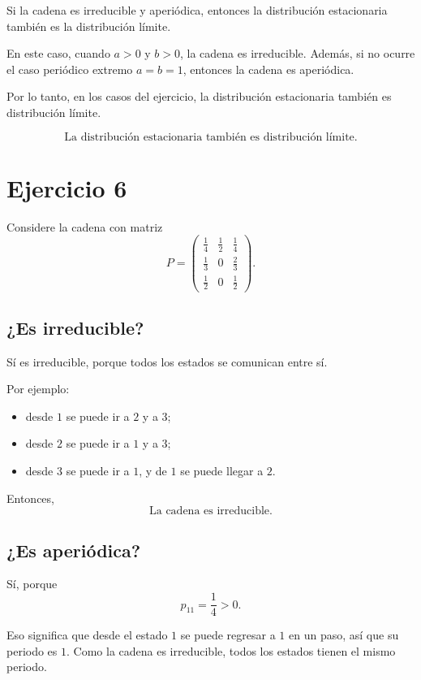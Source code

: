 \documentclass[12pt]{article}
\begin{document}
Si la cadena es irreducible y aperiódica, entonces la distribución estacionaria también es la distribución límite.

En este caso, cuando \(a>0\) y \(b>0\), la cadena es irreducible. Además, si no ocurre el caso periódico extremo \(a=b=1\), entonces la cadena es aperiódica.

Por lo tanto, en los casos del ejercicio, la distribución estacionaria también es distribución límite.

\[
\boxed{\text{La distribución estacionaria también es distribución límite.}}
\]

\newpage
\section*{Ejercicio 6}

Considere la cadena con matriz
\[
P=
\begin{pmatrix}
\frac14 & \frac12 & \frac14\\[4pt]
\frac13 & 0 & \frac23\\[4pt]
\frac12 & 0 & \frac12
\end{pmatrix}.
\]

\subsection*{¿Es irreducible?}

Sí es irreducible, porque todos los estados se comunican entre sí.

Por ejemplo:

\begin{itemize}
    \item desde \(1\) se puede ir a \(2\) y a \(3\);
    \item desde \(2\) se puede ir a \(1\) y a \(3\);
    \item desde \(3\) se puede ir a \(1\), y de \(1\) se puede llegar a \(2\).
\end{itemize}

Entonces,
\[
\boxed{\text{La cadena es irreducible.}}
\]

\subsection*{¿Es aperiódica?}

Sí, porque
\[
p_{11}=\frac14>0.
\]

Eso significa que desde el estado \(1\) se puede regresar a \(1\) en un paso, así que su periodo es \(1\). Como la cadena es irreducible, todos los estados tienen el mismo periodo.
\end{document}
